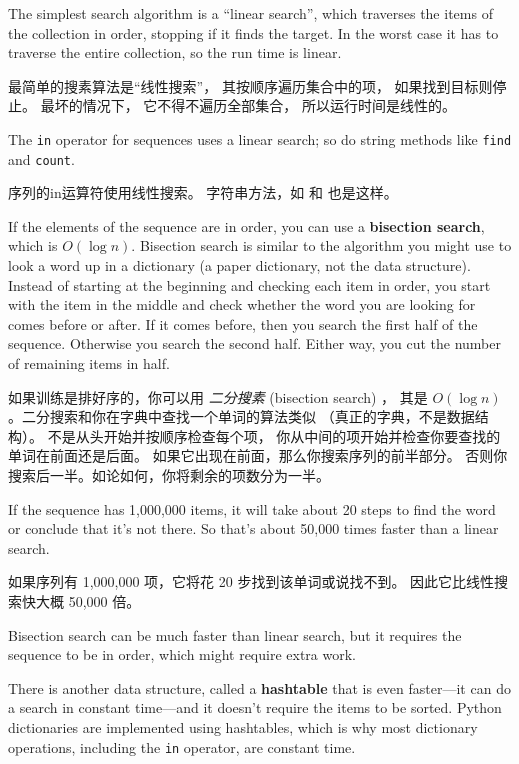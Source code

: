The simplest search algorithm is a ``linear search'', which traverses
the items of the collection in order, stopping if it finds the target.
In the worst case it has to traverse the entire collection, so the run
time is linear.

最简单的搜素算法是``线性搜索''， 其按顺序遍历集合中的项， 如果找到目标则停止。 最坏的情况下， 它不得不遍历全部集合， 所以运行时间是线性的。

The {\tt in} operator for sequences uses a linear search; so do string
methods like {\tt find} and {\tt count}.

序列的in运算符使用线性搜索。 字符串方法，如  和  也是这样。

If the elements of the sequence are in order, you can use a {\bf
  bisection search}, which is $O(\log n)$.  Bisection search is
similar to the algorithm you might use to look a word up in a
dictionary (a paper dictionary, not the data structure).  Instead of
starting at the beginning and checking each item in order, you start
with the item in the middle and check whether the word you are looking
for comes before or after.  If it comes before, then you search the
first half of the sequence.  Otherwise you search the second half.
Either way, you cut the number of remaining items in half.

如果训练是排好序的，你可以用 {\em 二分搜素} (bisection search) ，
其是 $O(\log n)$ 。二分搜索和你在字典中查找一个单词的算法类似
（真正的字典，不是数据结构）。 不是从头开始并按顺序检查每个项，
你从中间的项开始并检查你要查找的单词在前面还是后面。
如果它出现在前面，那么你搜索序列的前半部分。
否则你搜索后一半。如论如何，你将剩余的项数分为一半。
  

If the sequence has 1,000,000 items, it will take about 20 steps to
find the word or conclude that it's not there.  So that's about 50,000
times faster than a linear search.

如果序列有 1,000,000 项，它将花 20 步找到该单词或说找不到。
因此它比线性搜索快大概 50,000 倍。


Bisection search can be much faster than linear search, but
it requires the sequence to be in order, which might require
extra work.



There is another data structure, called a {\bf hashtable} that
is even faster---it can do a search in constant time---and it
doesn't require the items to be sorted.  Python dictionaries
are implemented using hashtables, which is why most dictionary
operations, including the {\tt in} operator, are constant time.


